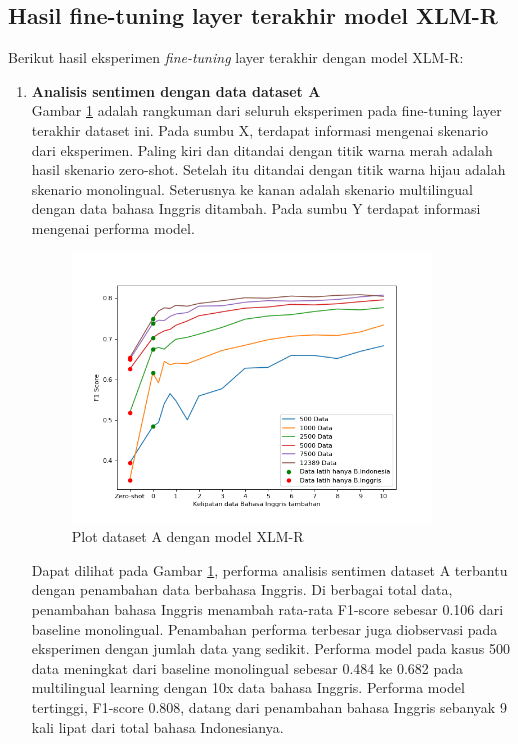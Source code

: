     \subsection{Hasil fine-tuning layer terakhir model XLM-R}
        Berikut hasil eksperimen \textit{fine-tuning} layer terakhir dengan model XLM-R: 
        \begin{enumerate}
            \item \textbf{Analisis sentimen dengan data dataset A} \\
            Gambar \ref{fig:plot_head_trip_xlmr} adalah rangkuman dari seluruh eksperimen pada fine-tuning layer terakhir dataset ini. Pada sumbu X, terdapat informasi mengenai skenario dari eksperimen. Paling kiri dan ditandai dengan titik warna merah adalah hasil skenario zero-shot. Setelah itu ditandai dengan titik warna hijau adalah skenario monolingual. Seterusnya ke kanan adalah skenario multilingual dengan data bahasa Inggris ditambah. Pada sumbu Y terdapat informasi mengenai performa model. 

            \begin{figure}[ht]
                \centering
                \includegraphics[width=0.9\textwidth]{resources/plot-head-trip-xlmr.png}
                \caption{Plot dataset A dengan model XLM-R}
                \label{fig:plot_head_trip_xlmr}
            \end{figure}

            Dapat dilihat pada Gambar \ref{fig:plot_head_trip_xlmr}, performa analisis sentimen dataset A terbantu dengan penambahan data berbahasa Inggris. Di berbagai total data, penambahan bahasa Inggris menambah rata-rata F1-score sebesar 0.106 dari baseline monolingual. Penambahan performa terbesar juga diobservasi pada eksperimen dengan jumlah data yang sedikit. Performa model pada kasus 500 data meningkat dari baseline monolingual sebesar 0.484 ke 0.682 pada multilingual learning dengan 10x data bahasa Inggris. Performa model tertinggi, F1-score 0.808, datang dari penambahan bahasa Inggris sebanyak 9 kali lipat dari total bahasa Indonesianya.


\end{enumerate}
